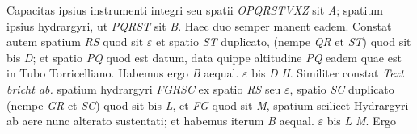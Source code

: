 \pend
\vspace{0.5em}
\pstart
\normalsize
{}
\pend 
\pstart
\footnotesize
Capacitas ipsius instrumenti integri %
seu spatii \textit{OPQRSTVXZ} sit \textit{A}; spatium %
ipsius hydrargyri, ut \textit{PQRST} %
sit \textit{B}. %
Haec duo %
semper manent eadem. %
\pend
\vspace{1.25em}
\pstart
\normalsize
{}
\pend 
\pstart
\footnotesize
Constat autem spatium %
\textit{RS} quod sit $\varepsilon$ et spatio \textit{ST} duplicato, (nempe %
\textit{QR} et \textit{ST}) quod sit bis \textit{D}; et spatio \textit{PQ} %
quod %
est datum, data quippe altitudine \textit{PQ} eadem %
quae est in Tubo Torricelliano. Habemus %
ergo \textit{B} aequal. $\varepsilon$ %
bis \textit{D} %
\textit{H}. Similiter constat \lbrack\textit{Text bricht ab.}\rbrack
\pend
\vspace{0.25em}
\pstart
\normalsize
{}
\pend 
\pstart
\footnotesize
{} %
spatium hydrargyri \textit{FGRSC} ex spatio \textit{RS} seu $\varepsilon$, %
spatio \textit{SC} duplicato (nempe \textit{GR} et \textit{SC}) quod sit %
bis \textit{L}, et \textit{FG} quod sit \textit{M}, spatium scilicet Hydrargyri %
ab aere nunc alterato sustentati; et habemus %
iterum \textit{B} aequal. $\varepsilon$ %
bis \textit{L}
\textit{M}. Ergo %
